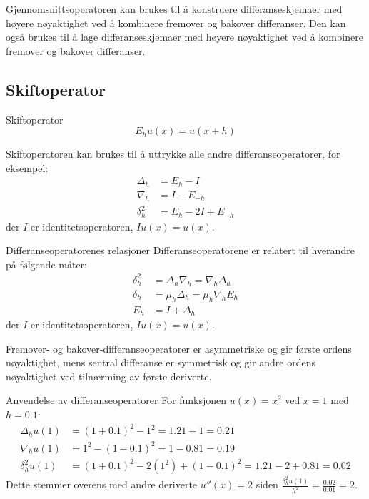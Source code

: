 \begin{remark*}{}{}
  Gjennomsnittsoperatoren kan brukes til å konstruere differanseskjemaer med høyere nøyaktighet ved å kombinere fremover og bakover differanser.
  Den kan også brukes til å lage differanseskjemaer med høyere nøyaktighet ved å kombinere fremover og bakover differanser.
\end{remark*}

\subsection{Skiftoperator}
\begin{definition}{Skiftoperator}{}
  \begin{equation}
    E_h u(x) = u(x + h) \label{eq:shift_op}
  \end{equation}
\end{definition}

\begin{remark*}{}{}
  Skiftoperatoren kan brukes til å uttrykke alle andre differanseoperatorer, for eksempel:
  \begin{align}
    \Delta_h   & = E_h - I           \\
    \nabla_h   & = I - E_{-h}        \\
    \delta_h^2 & = E_h - 2I + E_{-h}
  \end{align}
  der $I$ er identitetsoperatoren, $Iu(x) = u(x)$.
\end{remark*}

\begin{theorem}{Differanseoperatorenes relasjoner}{}
  Differanseoperatorene er relatert til hverandre på følgende måter:
  \begin{align}
    \delta_h^2 & = \Delta_h \nabla_h = \nabla_h \Delta_h \\
    \delta_h   & = \mu_h \Delta_h = \mu_h \nabla_h E_h   \\
    E_h        & = I + \Delta_h
  \end{align}
  der $I$ er identitetsoperatoren, $Iu(x) = u(x)$.
\end{theorem}

\begin{remark*}{}{}
  Fremover- og bakover-differanseoperatorer er asymmetriske og gir første ordens nøyaktighet,
  mens sentral differanse er symmetrisk og gir andre ordens nøyaktighet ved tilnærming av første deriverte.
\end{remark*}

\begin{example}{Anvendelse av differanseoperatorer}{}
  For funksjonen $u(x) = x^2$ ved $x=1$ med $h=0.1$:
  \begin{align*}
    \Delta_h u(1)   & = (1+0.1)^2 - 1^2 = 1.21 - 1 = 0.21                       \\
    \nabla_h u(1)   & = 1^2 - (1-0.1)^2 = 1 - 0.81 = 0.19                       \\
    \delta_h^2 u(1) & = (1+0.1)^2 - 2(1^2) + (1-0.1)^2 = 1.21 - 2 + 0.81 = 0.02
  \end{align*}
  Dette stemmer overens med andre deriverte $u''(x) = 2$ siden $\frac{\delta_h^2 u(1)}{h^2} = \frac{0.02}{0.01} = 2$.
\end{example}

